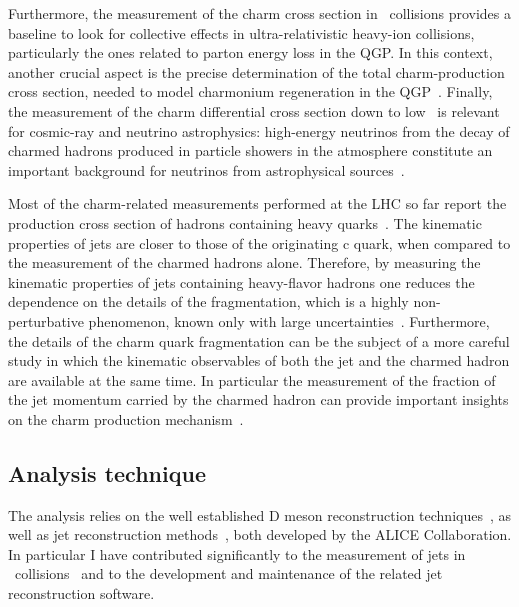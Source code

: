 \documentclass[a4paper]{jpconf}
\begin{document}
Furthermore, the measurement of the charm cross section in \pp\ collisions provides a baseline to look for collective effects in ultra-relativistic
heavy-ion collisions, particularly the ones related to parton energy loss in the QGP. In this context, another crucial aspect is the precise determination of the
total charm-production cross section, needed to model charmonium regeneration in the QGP~\cite{Zhao:2011}.
Finally, the measurement of the charm differential cross section down to low \pT\ is relevant for cosmic-ray and neutrino
astrophysics: high-energy neutrinos from the decay of charmed hadrons produced in particle showers in the atmosphere constitute an important
background for neutrinos from astrophysical sources~\cite{Gauld:2015, Bhattacharya:2015}.

Most of the charm-related measurements performed at the LHC so far report the production cross section of hadrons
containing heavy quarks~\cite{ALICE:2012d, ALICE:2012e, ATLAS:2012e, LHCb:2013a, ALICE:2014d, ATLAS:2014e, ALICE:2015c, ALICE:2015d, ALICE:2016a, ATLAS:2016a}.
The kinematic properties of jets are closer to those of the originating c quark, when compared to the measurement of the charmed hadrons alone.
Therefore, by measuring the kinematic properties of jets containing heavy-flavor hadrons 
one reduces the dependence on the details of the fragmentation, which is a highly non-perturbative phenomenon, known only with large uncertainties~\cite{dEnterria:2014}.
Furthermore, the details of the charm quark fragmentation can be the subject of a more careful study in which the kinematic observables 
of both the jet and the charmed hadron are available at the same time. In particular the measurement of the fraction of the jet momentum carried 
by the charmed hadron can provide important insights on the charm production mechanism~\cite{CDF:1990, UA1:1990, STAR:2009a, ATLAS:2012d}.

\subsection{Analysis technique}
The analysis relies on the well established D meson reconstruction techniques~\cite{ALICE:2012d, ALICE:2012e, ALICE:2014d, ALICE:2015c, ALICE:2015d, ALICE:2016a}, as well as
jet reconstruction methods~\cite{ALICE:2013c, ALICE:2014a, ALICE:2015e, ALICE:2015f}, both developed by the ALICE Collaboration. In particular I have
contributed significantly to the measurement of jets in \PbPb\ collisions~\cite{ALICE:2015a, Aiola:2013, Aiola:2014} and to the
development and maintenance of the related jet reconstruction software.
\end{document}
